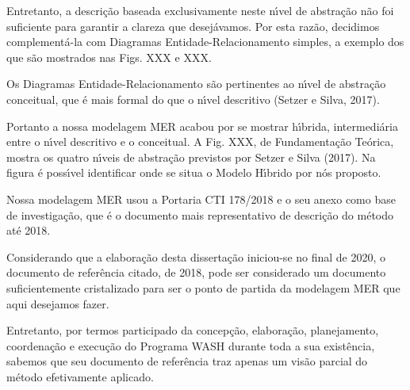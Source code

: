 \documentclass[
12pt,		%
openright,	%
twoside,  %
a4paper,			%
chapter=TITLE,		%
english,			%
french,				%
spanish,			%
brazil				%
]{USPSC-classe/USPSC}
\begin{document}
Entretanto, a descri\c{c}\~ao baseada exclusivamente neste n\'{\i}vel de abstra\c{c}\~ao n\~ao foi suficiente para garantir a clareza que desej\'avamos. Por esta raz\~ao, decidimos complement\'a-la com Diagramas Entidade-Relacionamento simples, a exemplo dos que s\~ao mostrados nas Figs. XXX e XXX.









Os Diagramas Entidade-Relacionamento s\~ao pertinentes ao n\'{\i}vel de abstra\c{c}\~ao conceitual, que \'e mais formal do que o n\'{\i}vel descritivo (Setzer e Silva, 2017).









Portanto a nossa modelagem MER acabou por se mostrar h\'{\i}brida, intermedi\'aria entre o n\'{\i}vel descritivo e o conceitual. A Fig. XXX, de Fundamenta\c{c}\~ao Te\'orica, mostra os quatro n\'{\i}veis de abstra\c{c}\~ao previstos por  Setzer e Silva (2017). Na figura \'e poss\'{\i}vel identificar onde se situa o Modelo H\'{\i}brido por n\'os proposto.









Nossa modelagem MER usou a Portaria CTI 178/2018 e o seu anexo como base de investiga\c{c}\~ao, que \'e o documento mais representativo de descri\c{c}\~ao do m\'etodo at\'e 2018.









Considerando que a elabora\c{c}\~ao desta disserta\c{c}\~ao iniciou-se no final de 2020, o documento de refer\^encia citado, de 2018, pode ser considerado um documento suficientemente cristalizado para ser o ponto de partida da modelagem MER que aqui desejamos fazer.









Entretanto, por termos participado da concep\c{c}\~ao, elabora\c{c}\~ao, planejamento, coordena\c{c}\~ao e execu\c{c}\~ao do Programa WASH durante toda a sua exist\^encia, sabemos que seu documento de refer\^encia traz apenas um vis\~ao parcial do m\'etodo efetivamente aplicado.
\end{document}
